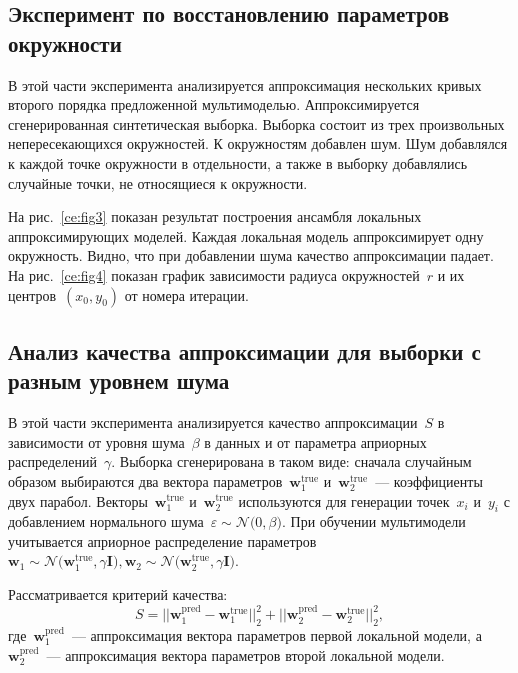 \documentclass[12pt]{a&t}
\begin{document}
\subsection{Эксперимент по восстановлению параметров окружности}

В этой части эксперимента анализируется аппроксимация нескольких кривых второго порядка предложенной мультимоделью. Аппроксимируется сгенерированная синтетическая выборка. Выборка состоит из трех произвольных непересекающихся окружностей. К окружностям добавлен шум. Шум добавлялся к каждой точке окружности в отдельности, а также в выборку добавлялись случайные точки, не относящиеся к окружности.

На рис.~\ref{ce:fig3} показан результат построения ансамбля локальных аппроксимирующих моделей. Каждая локальная модель аппроксимирует одну окружность. Видно, что при добавлении шума качество аппроксимации падает.
На рис.~\ref{ce:fig4} показан график зависимости радиуса окружностей~$r$ и их центров~$(x_0, y_0)$ от номера итерации.

\subsection{Анализ качества аппроксимации для выборки с разным уровнем шума}

В этой части эксперимента анализируется качество аппроксимации~$S$ в зависимости от уровня шума~$\beta$ в данных и от параметра априорных распределений~$\gamma$. Выборка сгенерирована в таком виде: сначала случайным образом выбираются два вектора параметров~$\mathbf{w}^\text{true}_{1}$ и~$\mathbf{w}^\text{true}_{2}$~--- коэффициенты двух парабол. Векторы~$\mathbf {w}^\text {true}_{1}$ и~$\mathbf{w}^\text {true}_{2}$ используются для генерации точек~$x_i$ и~$y_i$ с добавлением нормального шума~$\varepsilon\sim\mathcal {N} \bigr(0,\beta\bigr)$.
При обучении мультимодели учитывается априорное распределение параметров~$\mathbf{w}_1\sim\mathcal{N}\bigr(\mathbf{w}^\text{true}_{1}, \gamma \mathbf{I}\bigr),\mathbf{w}_2\sim\mathcal{N}\bigr(\mathbf{w}^\text{true}_{2}, \gamma\mathbf{I}\bigr)$.

Рассматривается критерий качества:
\[
S = ||\mathbf{w}^\text{pred}_{1} - \mathbf{w}^\text{true}_{1}||^{2}_{2} + ||\mathbf{w}^\text{pred}_{2} - \mathbf{w}^\text{true}_{2}||^{2}_{2},
\]
где~$\mathbf{w}^\text{pred}_{1}$~--- аппроксимация вектора параметров первой локальной модели, а~$\mathbf{w}^\text{pred}_{2}$~--- аппроксимация вектора параметров второй локальной модели.
\end{document}
